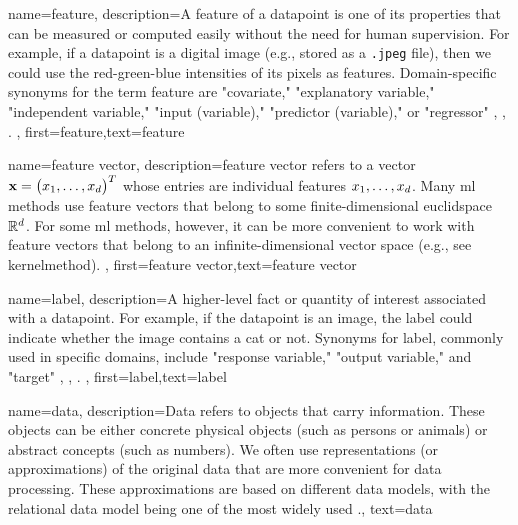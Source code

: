 {name={feature},
	description={A feature of a \gls{datapoint} is one of its properties that can be 
		measured or computed easily without the need for human supervision. For example, if a \gls{datapoint} 
		is a digital image (e.g., stored as a \texttt{.jpeg} file), then we could use the red-green-blue intensities 
		of its pixels as features. Domain-specific synonyms for the term feature are "covariate," "explanatory variable," 
		"independent variable," "input (variable)," "predictor (variable)," or "regressor" \cite{Gujarati2021}, \cite{Dodge2003}, \cite{Everitt2022}. 
		}, first={feature},text={feature}  
}

{name={feature vector},
	description={\Gls{feature} vector refers to a vector ${\bf x} = \big(x_{1},\ldots,x_{d}\big)^{T}$ 
	whose entries are individual \gls{feature}s $x_{1},\ldots,x_{d}$. Many \gls{ml} methods 
	use \gls{feature} vectors that belong to some finite-dimensional \gls{euclidspace} $\mathbb{R}^{d}$. 
	For some \gls{ml} methods, however, it can be more convenient to work with \gls{feature} 
	vectors that belong to an infinite-dimensional vector space (e.g., see \gls{kernelmethod}). 
		}, first={feature vector},text={feature vector}  
}


{name={label},
	description={A higher-level fact or quantity of interest associated with a \gls{datapoint}. 
		For example, if the \gls{datapoint} is an image, the label could indicate whether the 
		image contains a cat or not. Synonyms for label, commonly used in specific domains, 
		include "response variable," "output variable," and "target" \cite{Gujarati2021}, \cite{Dodge2003}, \cite{Everitt2022}.
 },
	first={label},text={label}  
}


{name={data},
	 description={Data refers to objects that carry information. These 
	 	objects can be either concrete physical objects (such as persons or animals) 
	 	or abstract concepts (such as numbers). We often use representations (or 
	 	approximations) of the original data that are more convenient for data processing. 
	 	These approximations are based on different data \gls{model}s, with the relational data 
	 	\gls{model} being one of the most widely used \cite{codd1970relational}.}, 
	text={data}
}

